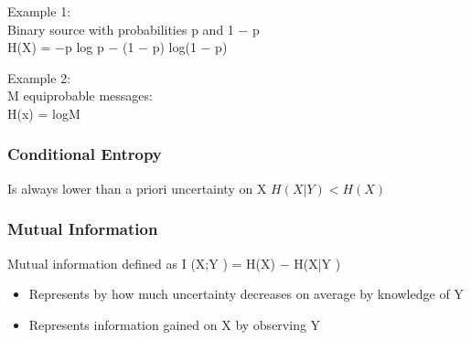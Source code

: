 ﻿\documentclass[a4]{beamer}
\begin{document}


\begin{frame}


Example 1:\\ Binary source with probabilities p and 1 − p\\
H(X) = −p log p − (1 − p) log(1 − p)


Example 2:\\ M equiprobable messages: \\
H(x) = logM


\end{frame}




\begin{frame}
\frametitle{Conditional Entropy}
Is always lower than a priori uncertainty on X
$H(X|Y ) < H(X)$
\end{frame}




\begin{frame}
\frametitle{Mutual Information}
Mutual information defined as
I (X;Y ) = H(X) − H(X|Y )
\begin{itemize}


\item Represents by how much uncertainty decreases on average by knowledge of Y
\item Represents information gained on X by observing Y
\end{itemize}
\end{frame}
\end{document}
